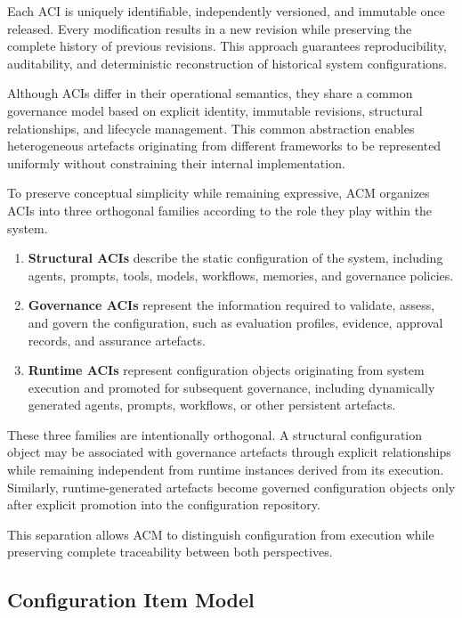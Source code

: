\documentclass[10pt]{article}
\begin{document}
Each ACI is uniquely identifiable, independently versioned, and immutable once released. Every modification results in a new revision while preserving the complete history of previous revisions. This approach guarantees reproducibility, auditability, and deterministic reconstruction of historical system configurations.

Although ACIs differ in their operational semantics, they share a common governance model based on explicit identity, immutable revisions, structural relationships, and lifecycle management. This common abstraction enables heterogeneous artefacts originating from different frameworks to be represented uniformly without constraining their internal implementation.

To preserve conceptual simplicity while remaining expressive, ACM organizes ACIs into three orthogonal families according to the role they play within the system.

\begin{enumerate}
    \item \textbf{Structural ACIs} describe the static configuration of the system, including agents, prompts, tools, models, workflows, memories, and governance policies.
    \item \textbf{Governance ACIs} represent the information required to validate, assess, and govern the configuration, such as evaluation profiles, evidence, approval records, and assurance artefacts.
    \item \textbf{Runtime ACIs} represent configuration objects originating from system execution and promoted for subsequent governance, including dynamically generated agents, prompts, workflows, or other persistent artefacts.
\end{enumerate}

These three families are intentionally orthogonal. A structural configuration object may be associated with governance artefacts through explicit relationships while remaining independent from runtime instances derived from its execution. Similarly, runtime-generated artefacts become governed configuration objects only after explicit promotion into the configuration repository.

This separation allows ACM to distinguish configuration from execution while preserving complete traceability between both perspectives.

\subsection{Configuration Item Model}
\label{sec:aci_model}
\end{document}

